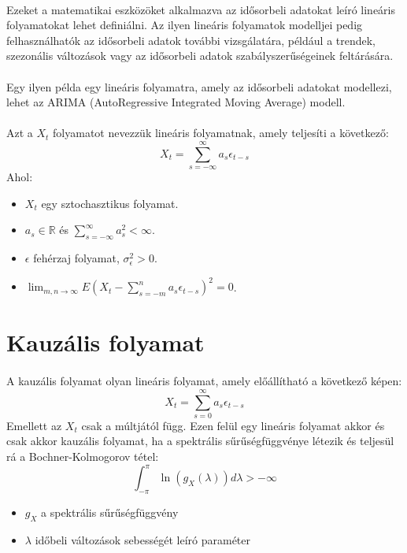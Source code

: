 \documentclass[11pt,a4paper]{article}
\begin{document}
			\paragraph{}
				Ezeket a matematikai eszközöket alkalmazva az idősorbeli adatokat leíró lineáris folyamatokat lehet definiálni. Az ilyen lineáris folyamatok modelljei pedig felhasználhatók az idősorbeli adatok további vizsgálatára, például a trendek, szezonális változások vagy az idősorbeli adatok szabályszerűségeinek feltárására.
			\paragraph{}
				Egy ilyen példa egy lineáris folyamatra, amely az idősorbeli adatokat modellezi, lehet az ARIMA (AutoRegressive Integrated Moving Average) modell.
			\paragraph{}
				Azt a $X_t$ folyamatot nevezzük lineáris folyamatnak, amely teljesíti a következő:
				$$X_t = \sum_{s= -\infty}^{\infty} a_s \epsilon_{t-s}$$
				Ahol:
				\begin{itemize}
					\item $X_t$ egy sztochasztikus folyamat.
					\item $a_s \in \mathbb{R}$ és $\sum_{s = - \infty}^{\infty} a_s^2 < \infty$.
					\item $\epsilon$ fehérzaj folyamat, $\sigma_\epsilon^2 > 0$.
					\item $\lim_{m,n \to \infty} E \left(X_t - \sum_{s = -m}^n a_s \epsilon_{t-s} \right)^2 = 0$.
				\end{itemize}

			\section{Kauzális folyamat}
				\paragraph{}
					A kauzális folyamat olyan lineáris folyamat, amely előállítható a következő képen:
					$$X_t = \sum_{s=0}^\infty a_s \epsilon_{t-s}$$
					Emellett az $X_t$ csak a múltjától függ. Ezen felül egy lineáris folyamat akkor és csak akkor kauzális folyamat, ha a spektrális sűrűségfüggvénye létezik és teljesül rá a Bochner-Kolmogorov tétel:
					$$\int_{-\pi}^\pi \ln(g_X(\lambda)) d\lambda > -\infty$$
					\begin{itemize}
						\item $g_X$ a spektrális sűrűségfüggvény
						\item $\lambda$ időbeli változások sebességét leíró paraméter
					\end{itemize}
					
\end{document}

